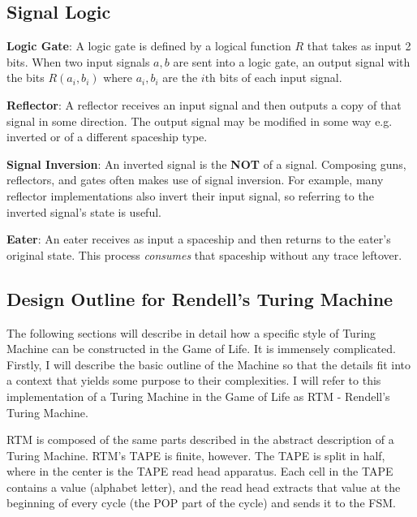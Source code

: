 \documentclass{article}
\begin{document}
\vspace{1em}
\subsection{Signal Logic}
\noindent\textbf{Logic Gate}: A logic gate is defined by a logical function $  R  $ that takes as input 2 bits. When two input signals $  a, b  $ are sent into a logic gate, an output signal with the bits $  R(a_i, b_i)  $ where $  a_i, b_i  $ are the $  i\text{th}  $ bits of each input signal.

\vspace{1em}

\noindent\textbf{Reflector}: A reflector receives an input signal and then outputs a copy of that signal in some direction. The output signal may be modified in some way e.g. inverted or of a different spaceship type.

\vspace{1em}

\noindent\textbf{Signal Inversion}: An inverted signal is the \textbf{NOT} of a signal. Composing guns, reflectors, and gates often makes use of signal inversion. For example, many reflector implementations also invert their input signal, so referring to the inverted signal's state is useful.

\vspace{1em}

\noindent\textbf{Eater}: An eater receives as input a spaceship and then returns to the eater's original state. This process \textit{consumes} that spaceship without any trace leftover.

\vspace{1em}
\subsection{Design Outline for Rendell's Turing Machine}


The following sections will describe in detail how a specific style of Turing Machine can be constructed in the Game of Life. It is immensely complicated. Firstly, I will describe the basic outline of the Machine so that the details fit into a context that yields some purpose to their complexities. I will refer to this implementation of a Turing Machine in the Game of Life as RTM - Rendell's Turing Machine.





RTM is composed of the same parts described in the abstract description of a Turing Machine. RTM's TAPE is finite, however. The TAPE is split in half, where in the center is the TAPE read head apparatus. Each cell in the TAPE contains a value (alphabet letter), and the read head extracts that value at the beginning of every cycle (the POP part of the cycle) and sends it to the FSM.
\end{document}
